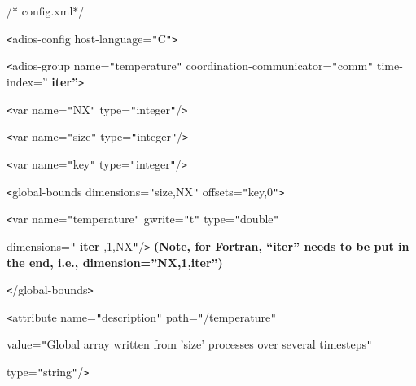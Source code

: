\vspace{22pt}
/* config.xml*/

\vspace{10pt}
\texttt{<}adios-config host-language=\texttt{"}C\texttt{"}\texttt{>}

\vspace{10pt}
\parindent=14pt
\texttt{<}adios-group name=\texttt{"}temperature\texttt{"} coordination-communicator=\texttt{"}comm\texttt{"} 
time-index=''{\color{color02} \textbf{iter''}}\texttt{>}

\vspace{10pt}
\parindent=28pt
\texttt{<}var name=\texttt{"}NX\texttt{"} type=\texttt{"}integer\texttt{"}/\texttt{>}

\vspace{10pt}
\texttt{<}var name=\texttt{"}size\texttt{"} type=\texttt{"}integer\texttt{"}/\texttt{>}

\vspace{10pt}
\parindent=57pt
\texttt{<}var name=\texttt{"}key\texttt{"} type=\texttt{"}integer\texttt{"}/\texttt{>}

\vspace{10pt}
\parindent=0pt
{\color{color02} \texttt{<}global-bounds dimensions=\texttt{"}size,NX\texttt{"} 
offsets=\texttt{"}key,0\texttt{"}\texttt{>}}

\vspace{10pt}
{\color{color02} \texttt{<}var name=\texttt{"}temperature\texttt{"} gwrite=\texttt{"}t\texttt{"} 
type=\texttt{"}double\texttt{"} }

\vspace{10pt}
{\color{color02} dimensions=\texttt{"}}{\color{color02} \textbf{iter}}{\color{color02} ,1,NX\texttt{"}/\texttt{>} 
   }{\color{color02} \textbf{(Note, for Fortran, ``iter'' needs to be put in the 
end, i.e., dimension=''NX,1,iter'')}}

\vspace{10pt}
\parindent=14pt
{\color{color02} \texttt{<}/global-bounds\texttt{>}}

\vspace{10pt}
\parindent=28pt
\texttt{<}attribute name=\texttt{"}description\texttt{"} path=\texttt{"}/temperature\texttt{"} 

\vspace{10pt}
\parindent=43pt
value=\texttt{"}Global array written from 'size' processes over several timesteps\texttt{"} 

\vspace{10pt}
type=\texttt{"}string\texttt{"}/\texttt{>}

